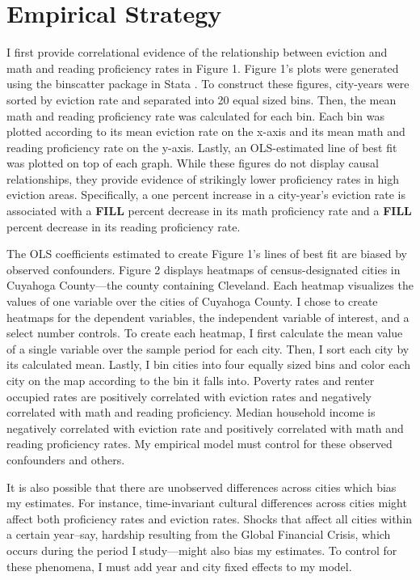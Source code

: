 \documentclass[12pt]{article}
\begin{document}
\section{Empirical Strategy} \label{sec:empirical_strategy}
I first provide correlational evidence of the relationship between eviction and math and reading proficiency rates in Figure 1. Figure 1's plots were generated using the binscatter package in Stata \citep{stepner_binscatter:_2013}. To construct these figures, city-years were sorted by eviction rate and separated into 20 equal sized bins. Then, the mean math and reading proficiency rate was calculated for each bin. Each bin was plotted according to its mean eviction rate on the x-axis and its mean math and reading proficiency rate on the y-axis. Lastly, an OLS-estimated line of best fit was plotted on top of each graph. While these figures do not display causal relationships, they provide evidence of strikingly lower proficiency rates in high eviction areas.  Specifically, a one percent increase in a city-year's eviction rate is associated with a \textbf{FILL} percent decrease in its math proficiency rate and a \textbf{FILL} percent decrease in its reading proficiency rate.

The OLS coefficients estimated to create Figure 1's lines of best fit are biased by observed confounders. Figure 2 displays heatmaps of census-designated cities in Cuyahoga County—the county containing Cleveland. Each heatmap visualizes the values of one variable over the cities of Cuyahoga County. I chose to create heatmaps for the dependent variables, the independent variable of interest, and a select number controls. To create each heatmap, I first calculate the mean value of a single variable over the sample period for each city. Then, I sort each city by its calculated mean. Lastly, I bin cities into four equally sized bins and color each city on the map according to the bin it falls into. Poverty rates and renter occupied rates are positively correlated with eviction rates and negatively correlated with math and reading proficiency. Median household income is negatively correlated with eviction rate and positively correlated with math and reading proficiency rates. My empirical model must control for these observed confounders and others.

It is also possible that there are unobserved differences across cities which bias my estimates. For instance, time-invariant cultural differences across cities might affect both proficiency rates and eviction rates. Shocks that affect all cities within a certain year–say, hardship resulting from the Global Financial Crisis, which occurs during the period I study—might also bias my estimates. To control for these phenomena, I must add year and city fixed effects to my model.
\end{document}
